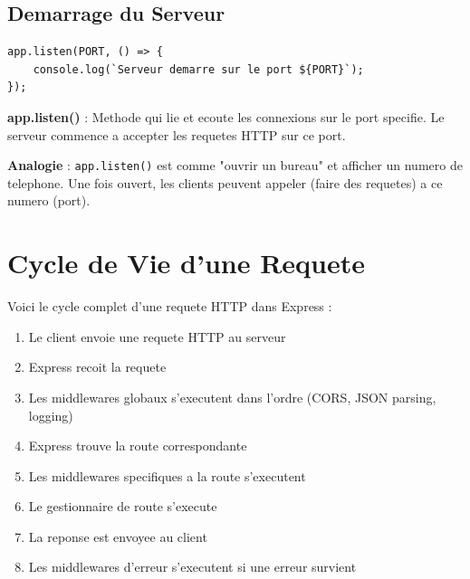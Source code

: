 \documentclass[a4paper,12pt]{book}
\begin{document}
\subsection{Demarrage du Serveur}

\begin{lstlisting}[style=javascript]
app.listen(PORT, () => {
    console.log(`Serveur demarre sur le port ${PORT}`);
});
\end{lstlisting}

\begin{definitionbox}
    \textbf{app.listen()} : Methode qui lie et ecoute les connexions sur le port specifie. Le serveur commence a accepter les requetes HTTP sur ce port.
\end{definitionbox}

\begin{analogybox}
    \textbf{Analogie} : \texttt{app.listen()} est comme "ouvrir un bureau" et afficher un numero de telephone. Une fois ouvert, les clients peuvent appeler (faire des requetes) a ce numero (port).
\end{analogybox}

\section{Cycle de Vie d'une Requete}

Voici le cycle complet d'une requete HTTP dans Express :

\begin{enumerate}
    \item Le client envoie une requete HTTP au serveur
    \item Express recoit la requete
    \item Les middlewares globaux s'executent dans l'ordre (CORS, JSON parsing, logging)
    \item Express trouve la route correspondante
    \item Les middlewares specifiques a la route s'executent
    \item Le gestionnaire de route s'execute
    \item La reponse est envoyee au client
    \item Les middlewares d'erreur s'executent si une erreur survient
\end{enumerate}
\end{document}
